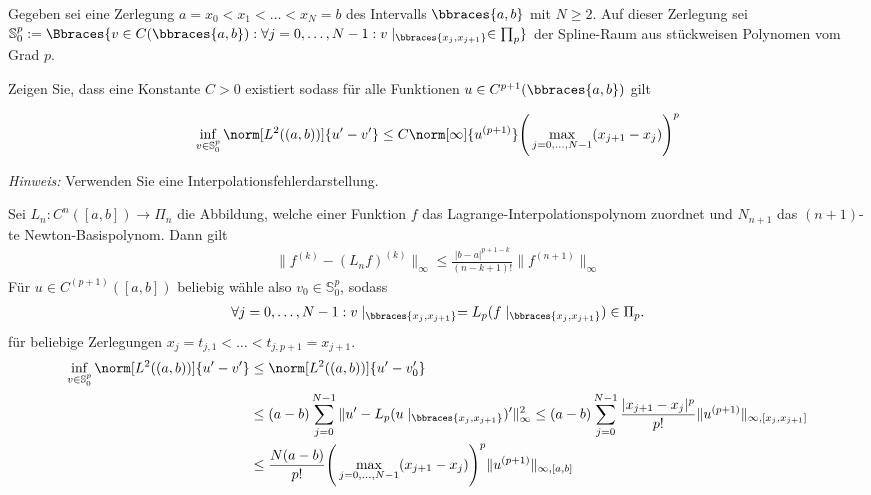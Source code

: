 
\begin{exercise}

Gegeben sei eine Zerlegung $a = x_0 < x_1 < \dots < x_N = b$ des Intervalls
$\bbraces{a,b}$ mit $N \geq 2$. Auf dieser Zerlegung sei
$\mathbb{S}_0^p := \Bbraces{v \in C(\bbraces{a,b}): \forall j = 0, \dots, N-1 : v\mid_{\bbraces{x_j , x_{j+1}}} \in \prod_p}$
der Spline-Raum aus stückweisen Polynomen vom Grad $p$.

Zeigen Sie, dass eine Konstante $C>0$ existiert sodass für alle Funktionen
$u \in C^{p+1}(\bbraces{a,b})$ gilt

\begin{align}
  \inf_{v\in \mathbb{S}^p_0} \norm[L^2((a,b))]{u' - v'}
  \leq C \norm[\infty]{u^{(p+1)}} \Bigg( \max_{j=0, \dots, N-1} (x_{j+1} - x_j)\Bigg)^p
\end{align}

\textit{Hinweis:} Verwenden Sie eine Interpolationsfehlerdarstellung.
\end{exercise}


\begin{solution}

Sei $L_n: C^n([a,b]) \to \Pi_n$ die Abbildung, welche einer Funktion $f$ das
Lagrange-Interpolationspolynom zuordnet und $N_{n+1}$ das $(n+1)$-te Newton-Basispolynom.
Dann gilt
\begin{align*}
  \|f^{(k)} - (L_nf)^{(k)}\|_{\infty} \leq \frac{|b-a|^{p+1-k}}{(n-k+1)!}\|f^{(n+1)}\|_{\infty}
\end{align*}
Für $u \in C^{(p+1)}([a,b])$ beliebig wähle also $v_0 \in \mathbb{S}_0^p$, sodass
\begin{align*}
  \forall j = 0,\dots,N-1: v\mid_{\bbraces{x_j , x_{j+1}}} = L_p(f\mid_{\bbraces{x_j , x_{j+1}}}) \in \Pi_p.
\end{align*}
für beliebige Zerlegungen $x_j = t_{j,1} < \dots < t_{j,p+1} = x_{j+1}$.
\begin{align*}
  \inf_{v\in \mathbb{S}^p_0} \norm[L^2((a,b))]{u' - v'} &\leq \norm[L^2((a,b))]{u' - v_0'} \\
  &\leq (a-b)\sum_{j=0}^{N-1}\|u^{\prime} - L_p(u\mid_{\bbraces{x_j , x_{j+1}}})^{\prime}\|_{\infty}^2
  \leq (a-b)\sum_{j=0}^{N-1}\frac{|x_{j+1} - x_j|^{p}}{p!}\|u^{(p+1)}\|_{\infty,[x_j,x_{j+1}]} \\
  &\leq \frac{N(a-b)}{p!}\Bigg( \max_{j=0, \dots, N-1} (x_{j+1} - x_j)\Bigg)^p\|u^{(p+1)}\|_{\infty,[a,b]}
\end{align*}

\end{solution}

